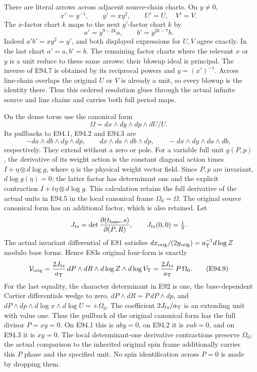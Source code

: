 There are literal arrows across adjacent source-chain
charts. On \(y\ne0\),
\[
 x'=y^{-1},\qquad y'=xy^2,\qquad U'=U,\quad V'=V.
 \tag{E94.6}
\]
The \(x\)-factor chart \(k\) maps to the next
\(y'\)-factor chart \(k\) by
\[
 a'=y^{9-2k}a,\qquad b'=y^{2k-7}b.              \tag{E94.7}
\]
Indeed \(a'b'=xy^2=y'\), and both displayed
expressions for \(U,V\) agree exactly. In the last
chart \(a'=a,b'=b\). The remaining factor charts
where the relevant \(x\) or \(y\) is a unit reduce
to these same arrows: their blowup ideal is principal.
The inverse of E94.7 is obtained by its reciprocal
powers and \(y=(x')^{-1}\). Across line-chain overlaps
the original \(U\) or \(V\) is already a unit, so
every blowup is the identity there. Thus this ordered
resolution glues through the actual infinite source
and line chains and carries both full period maps.

On the dense torus use the canonical form
\[
 \Omega=dx\wedge dy\wedge dp\wedge dU/U.          \tag{E94.8}
\]
Its pullbacks to E94.1, E94.2 and E94.3 are
\[
 -da\wedge db\wedge dy\wedge dp,\qquad
 dx\wedge da\wedge db\wedge dp,\qquad
 -dx\wedge dy\wedge da\wedge db,
\]
respectively. They extend without a zero or pole.
For a variable full unit \(g(P,p)\), the derivative
of its weight action is the constant diagonal action
times \(I+\eta\otimes d\log g\), where \(\eta\)
is the physical weight vector field. Since \(P,p\)
are invariant, \(d\log g(\eta)=0\); the latter
factor has determinant one and the explicit
contraction \(I+t\eta\otimes d\log g\).
This calculation retains the full derivative of the
actual units in E94.5 in the local canonical frame
\(\Omega_0=\Omega\). The original source canonical
form has an additional factor, which is also retained.
Let
\[
 J_{ts}=\det\frac{\partial(t_{\rm base},s)}
                     {\partial(P,R)},\qquad J_{ts}(0,0)=\tfrac12 .
\]
The actual invariant differential of E81 satisfies
\(dx_{\rm orig}/(2y_{\rm orig})
=a_{\rm T}^{-1}d\log Z\) modulo base forms. Hence
E83\textquotesingle s original four-form is exactly
\[
 \mathcal V_{\rm orig}
 =\frac{2J_{ts}}{a_{\rm T}}\,
       dP\wedge dR\wedge d\log Z\wedge d\log V_{\rm T}
 =\frac{2J_{ts}}{a_{\rm T}}\,P\,\Omega_0.         \tag{E94.9}
\]
For the last equality, the character determinant in
E92 is one, the base-dependent Cartier differentials
wedge to zero, \(dP\wedge dR=P\,dP\wedge dp\),
and \(dP\wedge dp\wedge d\log x\wedge d\log U
=+\Omega_0\). The coefficient \(2J_{ts}/a_{\rm T}\)
is an extending unit with value one. Thus the pullback
of the original canonical form has the full divisor
\(P=xy=0\). On E94.1 this is \(aby=0\), on E94.2
it is \(xab=0\), and on E94.3 it is \(xy=0\).
The local determinant-one derivative contractions
preserve \(\Omega_0\); the actual comparison to the
inherited original spin frame additionally carries
this \(P\) phase and the specified unit. No spin
identification across \(P=0\) is made by dropping them.

